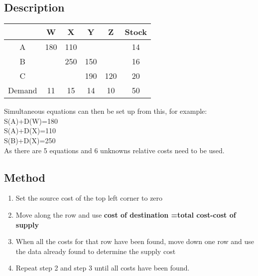 \documentclass{article}[18pt]
\newcommand{\cred}[1]{\color{red}#1}
\begin{document}
\subsection{Description}
\begin{center}
\begin{tabular}{ |c|c|c|c|c|c| }
\hline
&W&X&Y&Z&Stock\\
\hline
A&\cred{180}&\cred{110}&&&14\\
\hline
B&&\cred{250}&\cred{150}&&16\\
\hline
C&&&\cred{190}&\cred{120}&20\\
\hline
Demand&11&15&14&10&50\\
\hline
\end{tabular}
\end{center}
Simultaneous equations can then be set up from this, for example:\\
S(A)+D(W)=180\\
S(A)+D(X)=110\\
S(B)+D(X)=250\\
As there are 5 equations and 6 unknowns relative costs need to be used.\\
\subsection{Method}
\begin{enumerate}
\item Set the source cost of the top left corner to zero
\item Move along the row and use \textbf{cost of destination =total cost-cost of supply}
\item When all the costs for that row have been found, move down one row and use the data already found to determine the supply cost
\item Repeat step 2 and step 3 until all costs have been found.
\end{enumerate}
\end{document}
